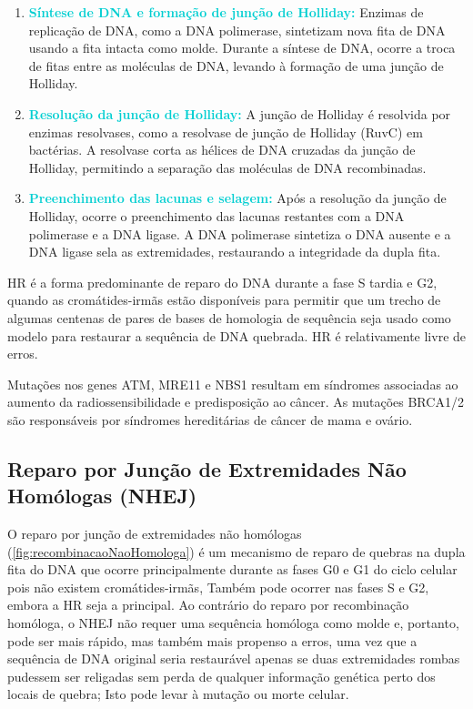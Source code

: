 \documentclass[11pt,a4paper]{article}
\begin{document}
\begin{enumerate}[label=\textcolor{CarnationPink}{\arabic*${}^\circ $}]
		\item \textcolor{DarkTurquoise}{\textbf{Síntese de DNA e formação de junção de Holliday:}} Enzimas de replicação de DNA, como a DNA polimerase, sintetizam nova fita de DNA usando a fita intacta como molde. Durante a síntese de DNA, ocorre a troca de fitas entre as moléculas de DNA, levando à formação de uma junção de Holliday.
		\item \textcolor{DarkTurquoise}{\textbf{Resolução da junção de Holliday:}} A junção de Holliday é resolvida por enzimas resolvases, como a resolvase de junção de Holliday (RuvC) em bactérias. A resolvase corta as hélices de DNA cruzadas da junção de Holliday, permitindo a separação das moléculas de DNA recombinadas.
		\item \textcolor{DarkTurquoise}{\textbf{Preenchimento das lacunas e selagem:}} Após a resolução da junção de Holliday, ocorre o preenchimento das lacunas restantes com a DNA polimerase e a DNA ligase. A DNA polimerase sintetiza o DNA ausente e a DNA ligase sela as extremidades, restaurando a integridade da dupla fita.
	\end{enumerate}

	HR é a forma predominante de reparo do DNA durante a fase S tardia e G2, quando as cromátides-irmãs estão disponíveis para permitir que um trecho de algumas centenas de pares de bases de homologia de sequência seja usado como modelo para restaurar a sequência de DNA quebrada. HR é relativamente livre de erros. 
	
	Mutações nos genes ATM, MRE11 e NBS1 resultam em síndromes associadas ao aumento da radiossensibilidade e predisposição ao câncer. As mutações BRCA1/2 são responsáveis por síndromes hereditárias de câncer de mama e ovário.

\subsection*{Reparo por Junção de Extremidades Não Homólogas (NHEJ)}

	O reparo por junção de extremidades não homólogas (\ref{fig:recombinacaoNaoHomologa}) é um mecanismo de reparo de quebras na dupla fita do DNA que ocorre principalmente durante as fases G0 e G1 do ciclo celular pois não existem cromátides-irmãs, Também pode ocorrer nas fases S e G2, embora a HR seja a principal. Ao contrário do reparo por recombinação homóloga, o NHEJ não requer uma sequência homóloga como molde e, portanto, pode ser mais rápido, mas também mais propenso a erros, uma vez que a sequência de DNA original seria restaurável apenas se duas extremidades rombas pudessem ser religadas sem perda de qualquer informação genética perto dos locais de quebra; Isto pode levar à mutação ou morte celular.
	
\end{document}
